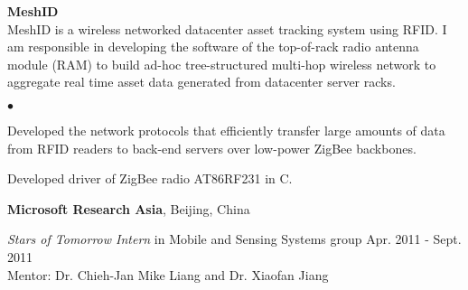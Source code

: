 \documentclass[margin,line]{res}
\newenvironment{list1}{
  \begin{list}{\ding{113}}{
      \setlength{\itemsep}{0in}
      \setlength{\parsep}{0in} \setlength{\parskip}{0in}
      \setlength{\topsep}{0in} \setlength{\partopsep}{0in}
      \setlength{\leftmargin}{0.17in}}}{\end{list}}
\newenvironment{list2}{
  \begin{list}{$\bullet$}{
      \setlength{\itemsep}{0in}
      \setlength{\parsep}{0in} \setlength{\parskip}{0in}
      \setlength{\topsep}{0in} \setlength{\partopsep}{0in}
      \setlength{\leftmargin}{0.2in}}}{\end{list}}
\begin{document}
\begin{resume}
      \vspace*{-.1in}
      \begin{list1}
        \item[] {\bf MeshID}\\
        MeshID is a wireless networked datacenter asset tracking system using RFID. I am responsible in developing the software of the top-of-rack radio antenna module (RAM) to build ad-hoc tree-structured multi-hop wireless network to aggregate real time asset data generated from datacenter server racks.
        \vspace*{.05in}
        \begin{list2}
          \item Developed the network protocols that efficiently transfer large amounts of data from RFID readers to back-end servers over low-power ZigBee backbones.
          \item Developed driver of ZigBee radio AT86RF231 in C.
        \end{list2}
      \end{list1}


      {\bf Microsoft Research Asia}, Beijing, China

      \vspace{-.3cm}
      {\em Stars of Tomorrow Intern} in Mobile and Sensing Systems group \hfill Apr. 2011 - Sept. 2011\\
      Mentor: Dr. Chieh-Jan Mike Liang and Dr. Xiaofan Jiang\\


\end{resume}
\end{document}
